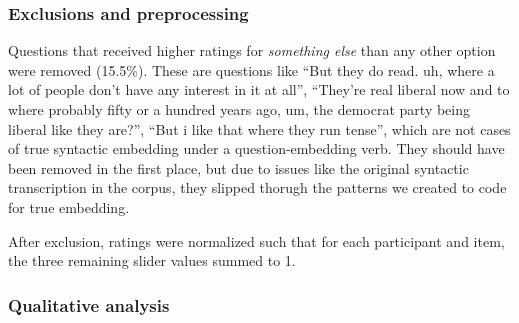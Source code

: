 \documentclass[12pt,letterpaper,table,svgnames,dvipsnames]{article}
\begin{document}
\subsubsection{Exclusions and preprocessing}
Questions that received higher ratings for \emph{something else} than any other option were removed (15.5\%). These are questions like 
``But they do read. uh, where a lot of people don't have any interest in it at all'',
``They're real liberal now and to where probably fifty or a hundred years ago, um, the democrat party being liberal like they are?'', 
``But i like that where they run tense'',
which are not cases of true syntactic embedding under a question-embedding verb. They should have been removed in the first place, but due to issues like the original syntactic transcription in the corpus, they slipped thorugh the patterns we created to code for true embedding. 

After exclusion, ratings were normalized such that for each participant and item, the three remaining slider values summed to 1.  

\subsubsection{Qualitative analysis}
\end{document}
